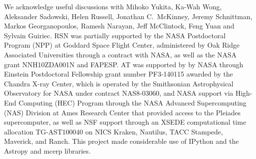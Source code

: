 \documentclass[useAMS,usenatbib]{mn2e}
\begin{document}
We acknowledge useful discussions with Mihoko Yukita, Ka-Wah Wong, Aleksander Sadowski, Helen Russell, Jonathan C.~McKinney, Jeremy Schnittman, Markos Georganopoulos, Ramesh Narayan, Jeff McClintock, Feng Yuan and Sylvain Guiriec. RSN was partially supported by the NASA Postdoctoral Program (NPP) at Goddard Space Flight Center, administered by Oak Ridge Associated Universities through a contract with NASA, as well as the NASA grant NNH10ZDA001N and FAPESP. AT was supported by by NASA through Einstein Postdoctoral Fellowship grant number PF3-140115 awarded by the Chandra X-ray Center, which is operated by the Smithsonian Astrophysical Observatory for NASA under contract NAS8-03060, and NASA support via High-End Computing (HEC) Program through the NASA Advanced Supercomputing (NAS) Division at Ames Research Center that provided access to the Pleiades supercomputer, as well as NSF support through an XSEDE computational time allocation TG-AST100040 on NICS Kraken, Nautilus, TACC Stampede, Maverick, and Ranch. This project made considerable use of IPython \citep{ipython} and the Astropy and mcerp libraries.



%




\bsp

\label{lastpage}
\end{document}
